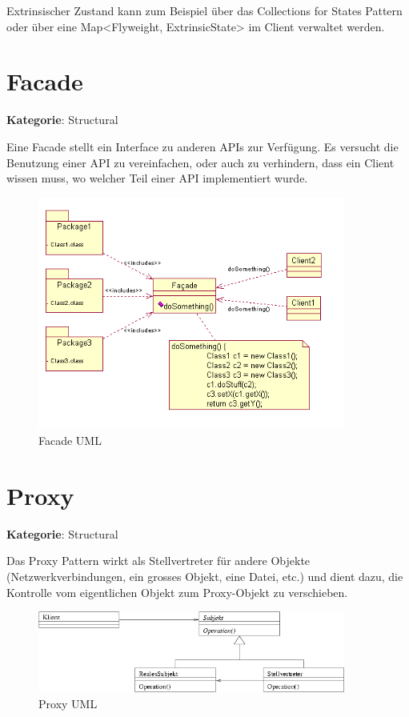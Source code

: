 Extrinsischer Zustand kann zum Beispiel über das Collections for States Pattern oder über eine Map<Flyweight, ExtrinsicState> im Client verwaltet werden.

\section{Facade}
\textbf{Kategorie}: Structural

Eine Facade stellt ein Interface zu anderen APIs zur Verfügung. Es versucht die Benutzung einer API zu vereinfachen, oder auch zu verhindern, dass ein Client wissen muss, wo welcher Teil einer API implementiert wurde.

\begin{figure}[H]
	\centering
	\includegraphics[width=0.9\textwidth]{content/gof/images/10-facade-uml.png}
	\caption{Facade UML}
\end{figure}


\section{Proxy}
\textbf{Kategorie}: Structural

Das Proxy Pattern wirkt als Stellvertreter für andere Objekte (Netzwerkverbindungen, ein grosses Objekt, eine Datei, etc.) und dient dazu, die Kontrolle vom eigentlichen Objekt zum Proxy-Objekt zu verschieben.

\begin{figure}[H]
	\centering
	\includegraphics[width=0.9\textwidth]{content/gof/images/11-proxy-uml.png}
	\caption{Proxy UML}
\end{figure}


